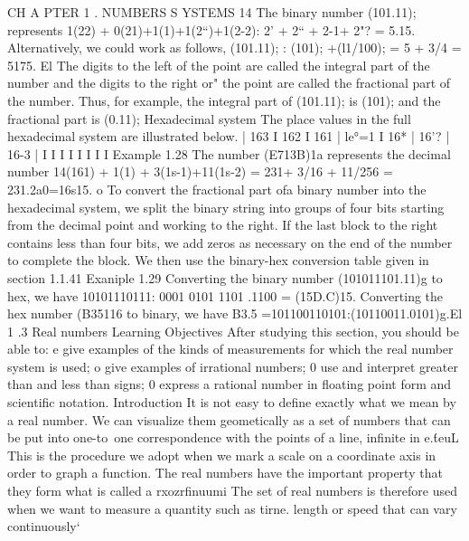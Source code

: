 CH A PTER 1 . NUMBERS S YSTEMS 14
The binary number (101.11); represents
1(22) + 0(21)+1(1)+1(2“)+1(2-2): 2’ + 2“ + 2-1+ 2"? = 5.15.
Alternatively, we could work as follows,
(101.11); : (101); +(l1/100); = 5 + 3/4 = 5175. El
The digits to the left of the point are called the integral part of the number and the digits to the
right or" the point are called the fractional part of the number. Thus, for example, the integral
part of (101.11); is (101); and the fractional part is (0.11);
Hexadecimal system
The place values in the full hexadecimal system are illustrated below.
 | 163 I 162 I 161 | le°=1 I 16* | 16'? | 16-3 | 
I I I I I I I I
Example 1.28 The number (E713B)1a represents the decimal number
14(161) + 1(1) + 3(1s-1)+11(1s-2) = 231+ 3/16 + 11/256 = 231.2a0=16s15. o
To convert the fractional part ofa binary number into the hexadecimal system, we split the binary
string into groups of four bits starting from the decimal point and working to the right. If the last
block to the right contains less than four bits, we add zeros as necessary on the end of the number
to complete the block. We then use the binary-hex conversion table given in section 1.1.41
Exaniple 1.29 Converting the binary number (101011101.11)g to hex, we have
10101110111: 0001 0101 1101 .1100 = (15D.C)15.
Converting the hex number (B35116 to binary, we have
B3.5 =101100110101:(10110011.0101)g.El
1 .3 Real numbers
Learning Objectives
After studying this section, you should be able to:
e give examples of the kinds of measurements for which the real number system is used;
o give examples of irrational numbers;
0 use and interpret greater than and less than signs;
0 express a rational number in ﬂoating point form and scientiﬁc notation.
Introduction
It is not easy to deﬁne exactly what we mean by a real number. We can visualize them geometically
as a set of numbers that can be put into one-to~one correspondence with the points of a line, inﬁnite
in e.\'teuL This is the procedure we adopt when we mark a scale on a coordinate axis in order to
graph a function. The real numbers have the important property that they form what is called a
rxozrfinuumi The set of real numbers is therefore used when we want to measure a quantity such as
tirne. length or speed that can vary continuously‘



